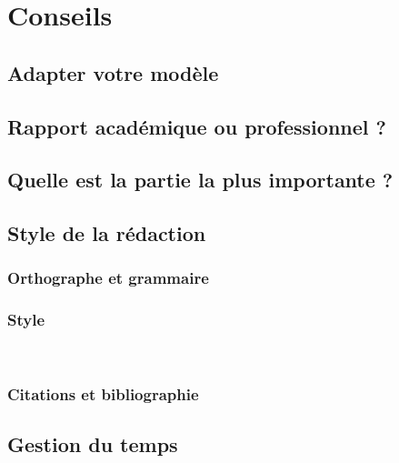 \chapter{Conseils}

\section{Adapter votre modèle}

\section{Rapport académique ou professionnel ?}

\section{Quelle est la partie la plus importante ?}

\section{Style de la rédaction}

\subsection{Orthographe et grammaire}

\subsection{Style}

\
\subsection{Citations et bibliographie}

\section{Gestion du temps}
